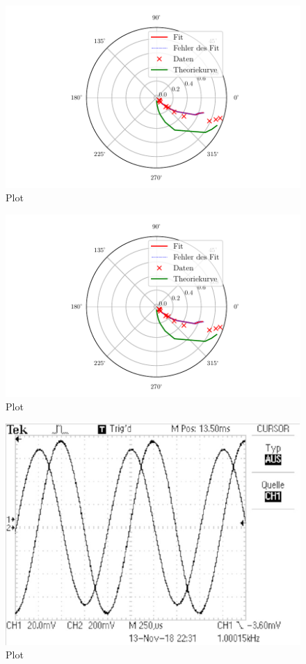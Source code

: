 \begin{figure}
  \centering
  \includegraphics{build/plotd2.pdf}
  \caption{Plot}
  \label{fig:plotd2}
\end{figure}

\begin{figure}
  \centering
  \includegraphics{build/plotd3.pdf}
  \caption{Plot}
  \label{fig:plotd3}
\end{figure}

\begin{figure}
  \centering
  \includegraphics{build/integrator1.pdf}
  \caption{Plot}
  \label{fig:plot}
\end{figure}


